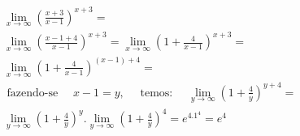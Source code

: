 \begin{ex}
\begin{align}
&\lim_{x\rightarrow \infty} \left(\frac{x+3}{x-1}\right)^{x+3}=\nonumber\\
&\lim_{x\rightarrow \infty} \left(\frac{x-1+4}{x-1}\right)^{x+3}=\lim_{x\rightarrow \infty} \left(1+\frac{4}{x-1}\right)^{x+3}=\nonumber\\
&\lim_{x\rightarrow \infty} \left(1+\frac{4}{x-1}\right)^{(x-1)+4}=\nonumber\\
&\text { fazendo-se }\quad x-1=y,\quad \text { temos: } \quad \lim_{y\rightarrow \infty} \left(1+\frac{4}{y}\right)^{y+4}=\nonumber\\
&\lim_{y\rightarrow \infty} \left(1+\frac{4}{y}\right)^y.\lim_{y\rightarrow \infty} \left(1+\frac{4}{y}\right)^4 = e^4.1^4 = e^4\nonumber
\end{align}
\end{ex}